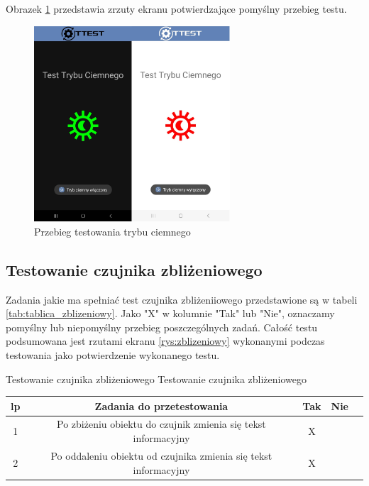 Obrazek \ref{rys:ciemny} przedstawia zrzuty ekranu potwierdzające pomyślny przebieg testu.

\begin{figure}[!hbt]
	\begin{center}
		\includegraphics[angle=360, width=0.65\textwidth]{rys/punkt5/ciemny.jpg}
		\caption{Przebieg testowania trybu ciemnego}
		\label{rys:ciemny}
	\end{center}
\end{figure}   

\newpage


\subsection{Testowanie czujnika zbliżeniowego}

Zadania jakie ma spełniać test czujnika zbliżeniiowego przedstawione są w tabeli \ref{tab:tablica_zblizeniowy}. Jako "X" w kolumnie "Tak" lub "Nie", oznaczamy pomyślny lub niepomyślny przebieg poszczególnych zadań. Całość testu podsumowana jest rzutami ekranu \ref{rys:zblizeniowy} wykonanymi podczas testowania jako potwierdzenie wykonanego testu.

\begin{tabela}
	{Testowanie czujnika zbliżeniowego}	%
	{Testowanie czujnika zbliżeniowego}	%
	{
		\begin{tabular}{|c|c|c|c|c|} \hline
			\textbf{lp} & \textbf{Zadania do przetestowania} & \textbf{Tak} & \textbf{Nie} \\ \hline
			1 & Po zbiżeniu obiektu do czujnik zmienia się tekst informacyjny  & X & ~ \\ \hline
			2 & Po oddaleniu obiektu od czujnika zmienia się tekst informacyjny & X & ~ \\ \hline
	\end{tabular}	}
	\label{tab:tablica_zblizeniowy}
\end{tabela}

